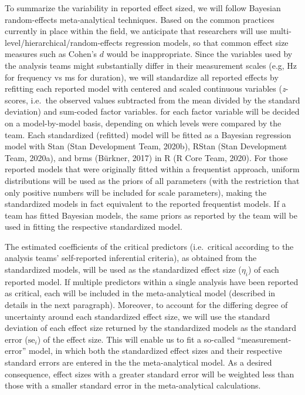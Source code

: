 \documentclass[
  english,
  man,floatsintext]{apa6}
\begin{document}
To summarize the variability in reported effect sized, we will follow Bayesian random-effects meta-analytical techniques.
Based on the common practices currently in place within the field, we anticipate that researchers will use multi-level/hierarchical/random-effects regression models, so that common effect size measures such as Cohen's \(d\) would be inappropriate.
Since the variables used by the analysis teams might substantially differ in their measurement scales (e.g, Hz for frequency vs ms for duration), we will standardize all reported effects by refitting each reported model with centered and scaled continuous variables (\emph{z}-scores, i.e.~the observed values subtracted from the mean divided by the standard deviation) and sum-coded factor variables.
 for each factor variable will be decided on a model-by-model basis, depending on which levels were compared by the team.
Each standardized (refitted) model will be fitted as a Bayesian regression model with Stan (Stan Development Team, 2020b), RStan (Stan Development Team, 2020a), and brms (Bürkner, 2017) in R (R Core Team, 2020).
For those reported models that were originally fitted within a frequentist approach, uniform distributions will be used as the priors of all parameters (with the restriction that only positive numbers will be included for scale parameters), making the standardized models in fact equivalent to the reported frequentist models.
If a team has fitted Bayesian models, the same priors as reported by the team will be used in fitting the respective standardized model.

The estimated coefficients of the critical predictors (i.e.~critical according to the analysis teams' self-reported inferential criteria), as obtained from the standardized models, will be used as the standardized effect size (\(\eta_i\)) of each reported model.
If multiple predictors within a single analysis have been reported as critical, each will be included in the meta-analytical model (described in details in the next paragraph).
Moreover, to account for the differing degree of uncertainty around each standardized effect size, we will use the standard deviation of each effect size returned by the standardized models as the standard error (\(\text{se}_i\)) of the effect size.
This will enable us to fit a so-called ``measurement-error'' model, in which both the standardized effect sizes and their respective standard errors are entered in the the meta-analytical model.
As a desired consequence, effect sizes with a greater standard error will be weighted less than those with a smaller standard error in the meta-analytical calculations.
\end{document}
